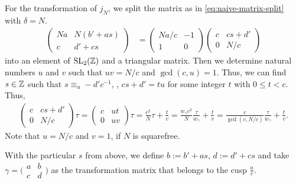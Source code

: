 \documentclass{article}
\begin{document}
\begin{Hemmecke}
For the transformation of $j_N$, we split the matrix as in
\eqref{eq:naive-matrix-split} with $\delta=N$.
\begin{align*}
  \begin{pmatrix}
    N a & N(b' + as)\\
    c & d' + cs
  \end{pmatrix}
      &=
  \begin{pmatrix}
    N a/c & -1\\
    1     &  0
  \end{pmatrix}
  \begin{pmatrix}
    c & cs+d'\\
    0 & N/c
  \end{pmatrix}
\end{align*}
into an element of $\SL2Z$ and a triangular matrix.
%
Then we determine natural numbers $u$ and $v$ such that $u v = N/c$
and $\gcd(c, u)=1$. Thus, we can find $s \in \mathbb{Z}$ such that
$s \equiv_u -d'c^{-1}$, \ie, $cs + d' = tu$ for some integer
$t$ with $0\le t<c$.
%
Thus,
\begin{gather*}
  \begin{pmatrix}
    c & cs+d'\\
    0 & N/c
  \end{pmatrix} \tau
  =
  \begin{pmatrix}
    c & u t\\
    0 & u v
  \end{pmatrix} \tau
  =
  \frac{c^2}{N} \tau + \frac{t}{v}
  =
 \frac{w_\gamma c^2}{N} \frac{\tau}{w_\gamma} + \frac{t}{v}
  =
 \frac{c}{\gcd(c,N/c)} \frac{\tau}{w_\gamma} + \frac{t}{v}
  .
\end{gather*}
Note that $u=N/c$ and $v=1$, if $N$ is squarefree.

With the particular $s$ from above, we define $b:=b'+as$, $d:=d'+cs$
and take
%
$\gamma = \bigl(
\begin{smallmatrix}
  a & b\\
  c & d
\end{smallmatrix}
\bigr)$ as the transformation matrix that belongs to the cusp
$\frac{a}{c}$.




\end{Hemmecke}
\end{document}
